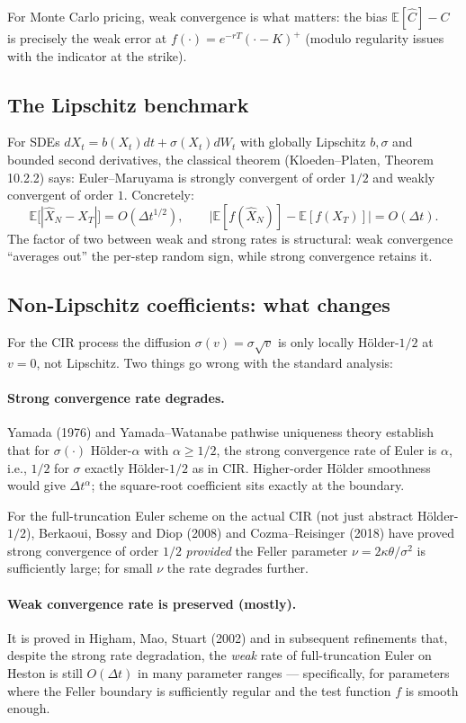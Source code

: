 \documentclass[11pt]{article}
\theoremstyle{plain}
\theoremstyle{definition}
\theoremstyle{remark}
\begin{document}
For Monte Carlo pricing, weak convergence is what matters: the bias $\mathbb{E}[\widehat C] - C$ is precisely the weak error at $f(\cdot) = e^{-rT}(\cdot - K)^+$ (modulo regularity issues with the indicator at the strike).

\subsection{The Lipschitz benchmark}

For SDEs $dX_t = b(X_t)dt + \sigma(X_t)dW_t$ with globally Lipschitz $b, \sigma$ and bounded second derivatives, the classical theorem (Kloeden--Platen, Theorem 10.2.2) says: Euler--Maruyama is strongly convergent of order $1/2$ and weakly convergent of order $1$. Concretely:
\[
    \mathbb{E}\bigl[|\hat X_N - X_T|\bigr] = O(\Delta t^{1/2}), \qquad \bigl|\mathbb{E}[f(\hat X_N)] - \mathbb{E}[f(X_T)]\bigr| = O(\Delta t).
\]
The factor of two between weak and strong rates is structural: weak convergence ``averages out'' the per-step random sign, while strong convergence retains it.

\subsection{Non-Lipschitz coefficients: what changes}

For the CIR process the diffusion $\sigma(v) = \sigma\sqrt{v}$ is only locally H\"older-$1/2$ at $v = 0$, not Lipschitz. Two things go wrong with the standard analysis:

\paragraph{Strong convergence rate degrades.} Yamada (1976) and Yamada--Watanabe pathwise uniqueness theory establish that for $\sigma(\cdot)$ H\"older-$\alpha$ with $\alpha \geq 1/2$, the strong convergence rate of Euler is $\alpha$, i.e., $1/2$ for $\sigma$ exactly H\"older-$1/2$ as in CIR. Higher-order H\"older smoothness would give $\Delta t^\alpha$; the square-root coefficient sits exactly at the boundary.

For the full-truncation Euler scheme on the actual CIR (not just abstract H\"older-$1/2$), Berkaoui, Bossy and Diop (2008) and Cozma--Reisinger (2018) have proved strong convergence of order $1/2$ \emph{provided} the Feller parameter $\nu = 2\kappa\theta/\sigma^2$ is sufficiently large; for small $\nu$ the rate degrades further.

\paragraph{Weak convergence rate is preserved (mostly).} It is proved in Higham, Mao, Stuart (2002) and in subsequent refinements that, despite the strong rate degradation, the \emph{weak} rate of full-truncation Euler on Heston is still $O(\Delta t)$ in many parameter ranges --- specifically, for parameters where the Feller boundary is sufficiently regular and the test function $f$ is smooth enough.
\end{document}
